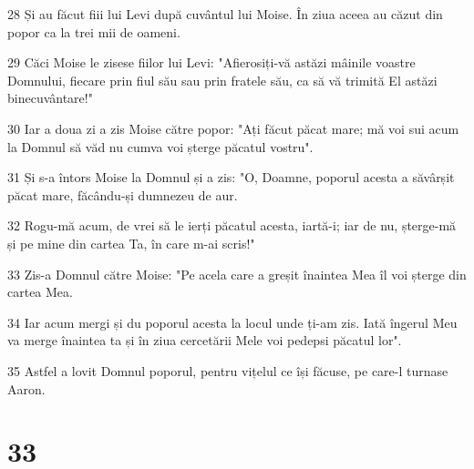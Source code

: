 \par 28 Și au făcut fiii lui Levi după cuvântul lui Moise. În ziua aceea au căzut din popor ca la trei mii de oameni.
\par 29 Căci Moise le zisese fiilor lui Levi: "Afierosiți-vă astăzi mâinile voastre Domnului, fiecare prin fiul său sau prin fratele său, ca să vă trimită El astăzi binecuvântare!"
\par 30 Iar a doua zi a zis Moise către popor: "Ați făcut păcat mare; mă voi sui acum la Domnul să văd nu cumva voi șterge păcatul vostru".
\par 31 Și s-a întors Moise la Domnul și a zis: "O, Doamne, poporul acesta a săvârșit păcat mare, făcându-și dumnezeu de aur.
\par 32 Rogu-mă acum, de vrei să le ierți păcatul acesta, iartă-i; iar de nu, șterge-mă și pe mine din cartea Ta, în care m-ai scris!"
\par 33 Zis-a Domnul către Moise: "Pe acela care a greșit înaintea Mea îl voi șterge din cartea Mea.
\par 34 Iar acum mergi și du poporul acesta la locul unde ți-am zis. Iată îngerul Meu va merge înaintea ta și în ziua cercetării Mele voi pedepsi păcatul lor".
\par 35 Astfel a lovit Domnul poporul, pentru vițelul ce își făcuse, pe care-l turnase Aaron.

\chapter{33}

